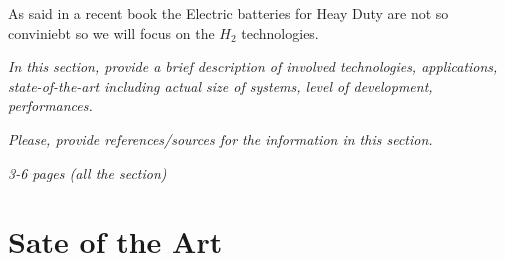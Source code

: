 As said in a recent book the Electric batteries for Heay Duty are not so conviniebt so we will focus on the $H_2$ technologies.
\cite{Mazzo2021}

\newpage

\textit{In this section, provide a brief description of involved technologies, applications, state-of-the-art including actual size of systems, level of development, performances.}

\textit{Please, provide references/sources for the information in this section.}

\textit{3-6 pages (all the section)}

\section{Sate of the Art}